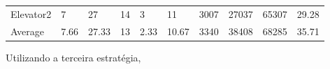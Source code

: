\documentclass[a4paper]{article}
\begin{document}
\begin{table}[h]
\begin{tabular}{@{}llllllllll@{}}
Elevator2 & 7        & 27            & 14           & 3                                                               & 11                                                                  & 3007                                                         & 27037                                                 & 65307                                                   & 29.28         \\
Average   & 7.66     & 27.33         & 13        & 2.33                                                               & 10.67 & 3340                                                         & 38408                                                 & 68285                                                   & 35.71          \\ \bottomrule
\end{tabular}
\end{table}

Utilizando a terceira estratégia,
\end{document}
